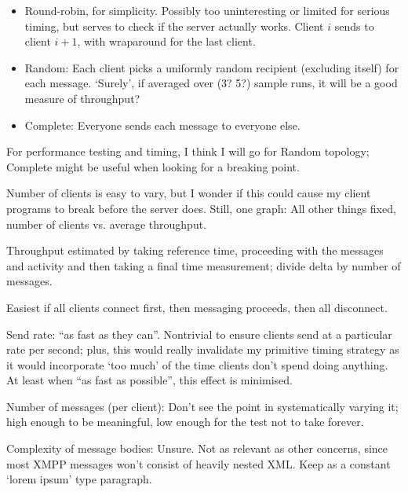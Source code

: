 \begin{itemize}
  \item Round-robin, for simplicity. Possibly too uninteresting or limited for serious timing, but serves to check if the server actually works. Client $i$ sends to client $i+1$, with wraparound for the last client.

  \item Random: Each client picks a uniformly random recipient (excluding itself) for each message. `Surely', if averaged over (3? 5?) sample runs, it will be a good measure of throughput?

  \item Complete: Everyone sends each message to everyone else.
\end{itemize}

For performance testing and timing, I think I will go for Random topology; Complete might be useful when looking for a breaking point.

Number of clients is easy to vary, but I wonder if this could cause my client programs to break before the server does. Still, one graph: All other things fixed, number of clients vs. average throughput.

Throughput estimated by taking reference time, proceeding with the messages and activity and then taking a final time measurement; divide delta by number of messages.

Easiest if all clients connect first, then messaging proceeds, then all disconnect.

Send rate: ``as fast as they can''. Nontrivial to ensure clients send at a particular rate per second; plus, this would really invalidate my primitive timing strategy as it would incorporate `too much' of the time clients don't spend doing anything. At least when ``as fast as possible'', this effect is minimised.

Number of messages (per client): Don't see the point in systematically varying it; high enough to be meaningful, low enough for the test not to take forever.

Complexity of message bodies: Unsure. Not as relevant as other concerns, since most XMPP messages won't consist of heavily nested XML. Keep as a constant `lorem ipsum' type paragraph.
